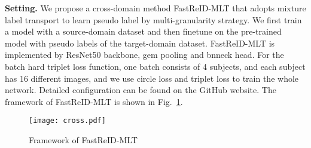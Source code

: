 \documentclass[10pt,twocolumn,letterpaper]{article}
\begin{document}
\noindent\textbf{Setting.} We propose a cross-domain method FastReID-MLT that adopts mixture label transport to learn pseudo label by multi-granularity strategy. We first train a model with a source-domain dataset and then finetune on the pre-trained model with pseudo labels of the target-domain dataset. FastReID-MLT is implemented by ResNet50 backbone, gem pooling and bnneck head. For the batch hard triplet loss function, one batch consists of 4 subjects, and each subject has 16 different images, and we use circle loss and triplet loss to train the whole network. 
Detailed configuration can be found on the GitHub website. The framework of FastReID-MLT is shown in Fig.~\ref{fig9}. 
\begin{figure}[t]
    \centering
    \texttt{[image: cross.pdf]}
     \caption{{Framework of FastReID-MLT}}
    \label{fig9}
\end{figure}
\end{document}
